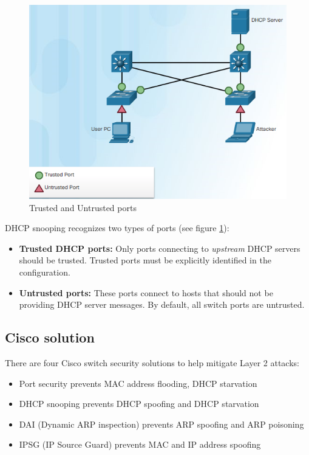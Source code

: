 \begin{figure}[hbtp]
\caption{Trusted and Untrusted ports}\label{DHCPsnooping}
\centering
\includegraphics[scale=1]{pictures/DHCPsnooping.PNG}
\end{figure}

DHCP snooping recognizes two types of ports (see figure \ref{DHCPsnooping}):

\begin{itemize}
\item \textbf{Trusted DHCP ports:} Only ports connecting to \emph{upstream} DHCP servers should be trusted. Trusted ports must be explicitly identified in the configuration.
\item \textbf{Untrusted ports:} These ports connect to hosts that should not be providing DHCP server messages. By default, all switch ports are untrusted.
\end{itemize}

\subsection{Cisco solution}
There are four Cisco switch security solutions to help mitigate Layer 2 attacks:

\begin{itemize}
\item Port security prevents MAC address flooding, DHCP starvation
\item DHCP snooping prevents DHCP spoofing and DHCP starvation
\item DAI (Dynamic ARP inspection) prevents ARP spoofing and ARP poisoning 
\item IPSG (IP Source Guard) prevents MAC and IP address spoofing
\end{itemize}

